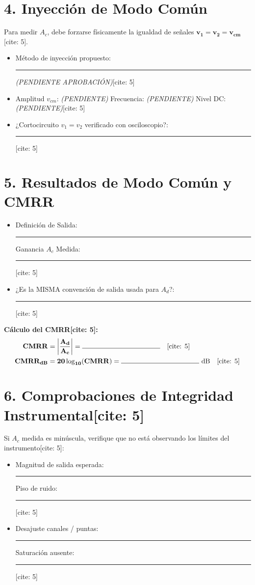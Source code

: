 \documentclass[11pt, a4paper]{article}
\begin{document}
\section*{4. Inyección de Modo Común}
Para medir $A_c$, debe forzarse físicamente la igualdad de señales $\mathbf{v_1 = v_2 = v_{cm}}$[cite: 5].
\begin{itemize}
    \item Método de inyección propuesto: \rule{4.5cm}{0.15mm} \textit{(PENDIENTE APROBACIÓN)}[cite: 5]
    \item Amplitud $v_{cm}$: \textit{(PENDIENTE)} \hfill Frecuencia: \textit{(PENDIENTE)} \hfill Nivel DC: \textit{(PENDIENTE)}[cite: 5]
    \item ¿Cortocircuito $v_1=v_2$ verificado con osciloscopio?: \rule{3cm}{0.15mm}[cite: 5]
\end{itemize}

\section*{5. Resultados de Modo Común y CMRR}
\begin{itemize}
    \item Definición de Salida: \rule{4.5cm}{0.15mm} \hfill Ganancia $A_c$ Medida: \rule{2.5cm}{0.15mm}[cite: 5]
    \item ¿Es la MISMA convención de salida usada para $A_d$?: \rule{3cm}{0.15mm}[cite: 5]
\end{itemize}
\textbf{Cálculo del CMRR[cite: 5]:}
\begin{align*}
    \mathbf{CMRR} &= \mathbf{\left|\frac{A_d}{A_c}\right|} = \rule{4cm}{0.15mm} \quad \text{[cite: 5]} \\
    \mathbf{CMRR_{dB}} &= \mathbf{20\log_{10}(CMRR)} = \rule{4cm}{0.15mm} \text{ dB} \quad \text{[cite: 5]}
\end{align*}

\section*{6. Comprobaciones de Integridad Instrumental[cite: 5]}
Si $A_{c}$ medida es minúscula, verifique que no está observando los límites del instrumento[cite: 5]:
\begin{itemize}
    \item Magnitud de salida esperada: \rule{3cm}{0.15mm} \hfill Piso de ruido: \rule{3cm}{0.15mm}[cite: 5]
    \item Desajuste canales / puntas: \rule{3cm}{0.15mm} \hfill Saturación ausente: \rule{3cm}{0.15mm}[cite: 5]
\end{itemize}
\end{document}

